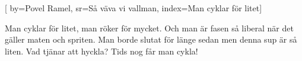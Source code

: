 [ 		
	by={Povel Ramel},					
	sr={Så väva vi vallman},					
	index={Man cyklar för litet}]		
	
\beginverse*						
Man cyklar för litet, 
man röker för mycket.
Och man är fasen så liberal 
när det gäller maten och spriten. 
Man borde slutat för länge sedan
men denna sup är så liten. 
Vad tjänar att hyckla? 
Tids nog får man cykla! 
\endverse										
\endsong		
